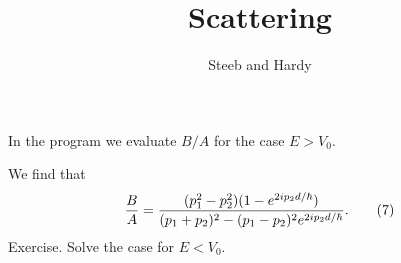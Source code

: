\documentclass[a4paper,14pt]{article}
\title{Scattering}
\author{Steeb and Hardy}
\begin{document}
\maketitle

%
%
%

\Large

In the program we evaluate $B/A$ for the case $E>V_0$.

We find that
\[
{B \over A}= \frac{ (p_1^2-p_2^2)(1-e^{2ip_2d/\hbar})}{(p_1+p_2)^2-(p_1-p_2)^2 e^{2ip_2d/\hbar}}.  \qquad   (7)
\]
Exercise. Solve the case for $E<V_0$.
\end{document}
